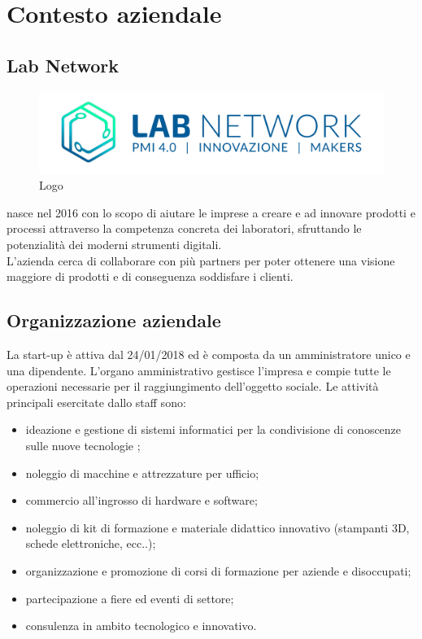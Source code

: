 
\chapter{Contesto aziendale}
\label{cap:introduzione}

\section{Lab Network}

\begin{figure}[H]
	\begin{center}
	\includegraphics[scale=0.4]{immagini/LOGO_LABNETWORK.png}
	\caption{Logo \lab{}}
	\end{center}
\end{figure}

\lab{} nasce nel 2016 con lo scopo di aiutare le imprese a creare e ad innovare prodotti e processi attraverso la competenza concreta dei laboratori, sfruttando le potenzialità dei moderni strumenti digitali.\\
L'azienda cerca di collaborare con più partners per poter ottenere una visione maggiore di prodotti e di conseguenza soddisfare i clienti.

\section{Organizzazione aziendale}
La start-up è attiva dal 24/01/2018 ed è composta da un amministratore unico e una dipendente.
L'organo amministrativo gestisce l'impresa e compie tutte le operazioni necessarie per il raggiungimento dell'oggetto sociale.
Le attività principali esercitate dallo staff sono:
\begin{itemize}
\item ideazione e gestione di sistemi informatici per la condivisione di conoscenze sulle nuove tecnologie ;
\item noleggio di macchine e attrezzature per ufficio;
\item commercio all'ingrosso di hardware e software;
\item noleggio di kit di formazione e materiale didattico innovativo (stampanti 3D, schede elettroniche, ecc..);
\item organizzazione e promozione di corsi di formazione per aziende e disoccupati;
\item partecipazione a fiere ed eventi di settore;
\item consulenza in ambito tecnologico e innovativo.
\end{itemize}
